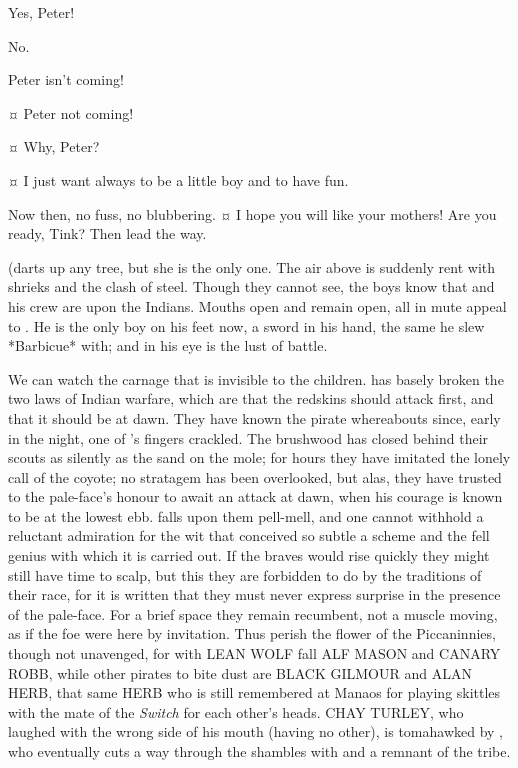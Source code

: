 \begin{drama}
\wendyspeaks
Yes, Peter!

\peterspeaks
No.


\wendyspeaks
Peter isn't coming!


\johnspeaks {}¤
Peter not coming!

\tootlesspeaks {}¤
Why, Peter?

\peterspeaks {}¤
I just want always to be a little boy and to have fun.


\speakercontinues
Now then, no fuss, no blubbering.
¤
I hope you will like your mothers!
Are you ready, Tink?
Then lead the way.

\begin{stagedir}
(\tink darts up any tree, but she is the only one.
The air above is suddenly rent with shrieks and the clash of steel.
Though they cannot see, the boys know that \hook and his crew are upon the Indians.
Mouths open and remain open, all in mute appeal to \peter.
He is the only boy on his feet now, a sword in his hand, the same he slew *Barbicue* with;
and in his eye is the lust of battle.

We can watch the carnage that is invisible to the children.
\hook has basely broken the two laws of Indian warfare,
which are that the redskins should attack first, and that it should be at dawn.
They have known the pirate whereabouts since, early in the night, one of \smee's fingers crackled.
The brushwood has closed behind their scouts as silently as the sand on the mole;
for hours they have imitated the lonely call of the coyote;
no stratagem has been overlooked, but alas, they have trusted to the pale-face's honour to await an attack at dawn,
when his courage is known to be at the lowest ebb.
\hook falls upon them pell-mell,
and one cannot withhold a reluctant admiration for the wit that conceived so subtle a scheme
and the fell genius with which it is carried out.
If the braves would rise quickly they might still have time to scalp,
but this they are forbidden to do by the traditions of their race,
for it is written that they must never express surprise in the presence of the pale-face.
For a brief space they remain recumbent, not a muscle moving, as if the foe were here by invitation.
Thus perish the flower of the Piccaninnies, though not unavenged,
for with {\namefont LEAN WOLF} fall {\namefont ALF MASON} and {\namefont CANARY ROBB},
while other pirates to bite dust are {\namefont BLACK GILMOUR} and {\namefont ALAN HERB},
that same {\namefont HERB} who is still remembered at Manaos
for playing skittles with the mate of the \emph{Switch} for each other's heads.
{\namefont CHAY TURLEY}, who laughed with the wrong side of his mouth (having no other),
is tomahawked by \panther,
who eventually cuts a way through the shambles with \tigerlily and a remnant of the tribe.


\end{stagedir}
\end{drama}

